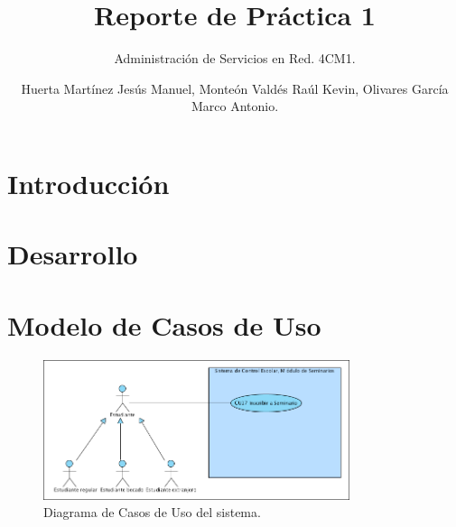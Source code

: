 \documentclass[oneside,10pt]{book}
\title{Reporte de Práctica 1}
\subtitle{Administración de Servicios en Red. 4CM1.}
\author{Huerta Martínez Jesús Manuel, Monteón Valdés Raúl Kevin, Olivares García Marco Antonio.}
\begin{document}
\maketitle
\thispagestyle{empty}

\frontmatter
\tableofcontents

\mainmatter


\chapter{Introducción}



\chapter{Desarrollo}

\chapter{Modelo de Casos de Uso}
	
	\begin{figure}[htbp!]
		\centering
			\includegraphics[width=0.8\textwidth]{images/CasosDeUso}
		\caption{Diagrama de Casos de Uso del sistema.}
	\end{figure}
	

\end{document}
